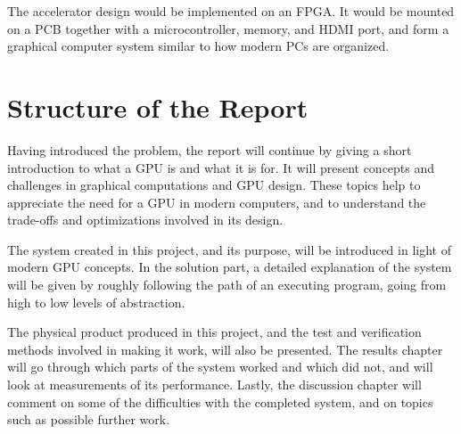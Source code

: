 \documentclass[../main/report.tex]{subfiles}
\begin{document}
The accelerator design would be implemented on an FPGA.
It would be mounted on a PCB together with a microcontroller, memory, and HDMI port, and form a graphical computer system similar to how modern PCs are organized.

\section{Structure of the Report}

Having introduced the problem, the report will continue by giving a short introduction to what a GPU is and what it is for.
It will present concepts and challenges in graphical computations and GPU design.
These topics help to appreciate the need for a GPU in modern computers, and to understand the trade-offs and optimizations involved in its design.

The system created in this project, and its purpose, will be introduced in light of modern GPU concepts.
In the solution part, a detailed explanation of the system will be given by roughly following the path of an executing program, going from high to low levels of abstraction.

The physical product produced in this project, and the test and verification methods involved in making it work, will also be presented.
The results chapter will go through which parts of the system worked and which did not, and will look at measurements of its performance.
Lastly, the discussion chapter will comment on some of the difficulties with the completed system, and on topics such as possible further work. 
\end{document}
